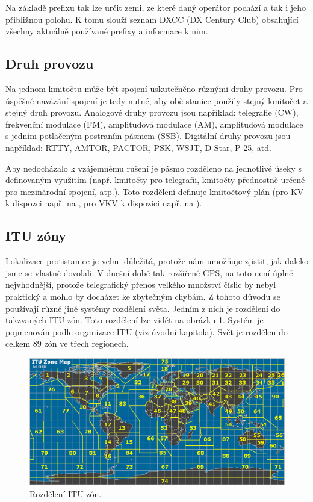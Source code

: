 Na základě prefixu tak lze určit zemi, ze které daný operátor pochází a tak i
jeho přibližnou polohu. K tomu slouží seznam DXCC (DX Century Club) \cite{dxcc} %
obsahující všechny aktuálně používané prefixy a informace k nim.

\subsection{Druh provozu}

Na jednom kmitočtu může být spojení uskutečněno různými druhy provozu. Pro
úspěšné navázání spojení je tedy nutné, aby obě stanice použily stejný kmitočet
a stejný druh provozu. Analogové druhy provozu jsou například: telegrafie (CW), frekvenční modulace (FM), amplitudová modulace (AM),
amplitudová modulace s jedním potlačeným postraním pásmem (SSB). Digitální druhy provozu jsou například: RTTY, AMTOR, PACTOR, PSK, WSJT, D-Star, P-25, atd.

Aby nedocházalo k vzájemnému rušení je pásmo rozděleno na jednotlivé úseky s
definovaným využitím (např. kmitočty pro telegrafii, kmitočty přednostně určené
pro mezinárodní spojení, atp.). Toto rozdělení definuje kmitočtový plán (pro KV
k dispozci např. na \cite{plan_kv}, pro VKV k dispozici např. na
\cite{plan_kv}).

\subsection{ITU zóny}

Lokalizace protistanice je velmi důležitá, protože nám umožňuje zjistit, jak
daleko jsme se vlastně dovolali. V dnešní době tak rozšířené GPS, na toto není
úplně nejvhodnější, protože telegrafický přenos velkého množství číslic
by nebyl praktický a mohlo by docházet ke zbytečným chybám. Z tohoto důvodu se
používají různé jiné systémy rozdělení světa. Jedním z nich je rozdělení do takzvaných ITU zón.
Toto rozdělení lze vidět na obrázku \ref{fig:itu_zony}.
Systém je pojmenován podle organizace ITU (viz úvodní kapitola). Svět je rozdělen do celkem 
89 zón ve třech regionech.

\begin{figure}[h]
\centering
\includegraphics[trim=0cm 0cm 0cm 0cm, scale=0.4]{fig/itu-zone}
\caption{Rozdělení ITU zón.}
\label{fig:itu_zony}
\end{figure}


